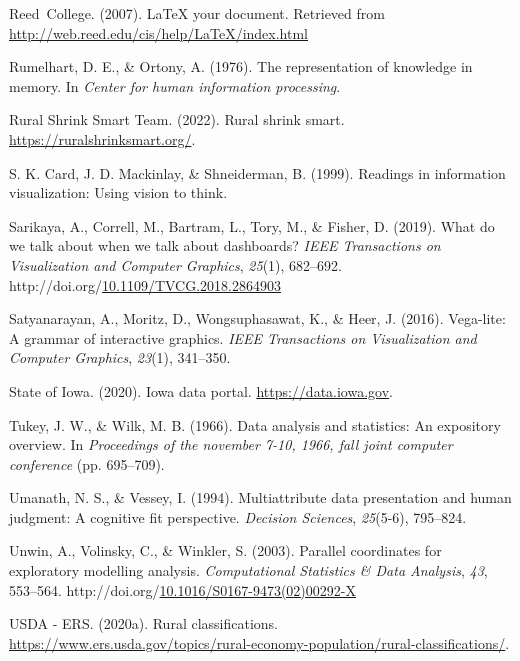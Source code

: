 \documentclass[print]{nuthesis}
\newlength{\cslhangindent}
\newenvironment{CSLReferences}[2]%
{\setlength{\parindent}{0pt}%
\everypar{\setlength{\hangindent}{\cslhangindent}}\ignorespaces}%
{\par}
\begin{document}
\begin{CSLReferences}{1}{0}
\leavevmode\hypertarget{ref-reedweb2007}{}%
Reed~College. (2007). LaTeX your document. Retrieved from \url{http://web.reed.edu/cis/help/LaTeX/index.html}

\leavevmode\hypertarget{ref-rumelhart1976}{}%
Rumelhart, D. E., \& Ortony, A. (1976). The representation of knowledge in memory. In \emph{Center for human information processing}.

\leavevmode\hypertarget{ref-scc}{}%
Rural Shrink Smart Team. (2022). Rural shrink smart. \url{https://ruralshrinksmart.org/}.

\leavevmode\hypertarget{ref-Card}{}%
S. K. Card, J. D. Mackinlay, \& Shneiderman, B. (1999). Readings in information visualization: Using vision to think.

\leavevmode\hypertarget{ref-fisher}{}%
Sarikaya, A., Correll, M., Bartram, L., Tory, M., \& Fisher, D. (2019). What do we talk about when we talk about dashboards? \emph{IEEE Transactions on Visualization and Computer Graphics}, \emph{25}(1), 682--692. http://doi.org/\href{https://doi.org/10.1109/TVCG.2018.2864903}{10.1109/TVCG.2018.2864903}

\leavevmode\hypertarget{ref-satyanarayan2016}{}%
Satyanarayan, A., Moritz, D., Wongsuphasawat, K., \& Heer, J. (2016). Vega-lite: A grammar of interactive graphics. \emph{IEEE Transactions on Visualization and Computer Graphics}, \emph{23}(1), 341--350.

\leavevmode\hypertarget{ref-iowa_gov}{}%
State of Iowa. (2020). Iowa data portal. \url{https://data.iowa.gov}.

\leavevmode\hypertarget{ref-tukey1966}{}%
Tukey, J. W., \& Wilk, M. B. (1966). Data analysis and statistics: An expository overview. In \emph{Proceedings of the november 7-10, 1966, fall joint computer conference} (pp. 695--709).

\leavevmode\hypertarget{ref-umanath1994}{}%
Umanath, N. S., \& Vessey, I. (1994). Multiattribute data presentation and human judgment: A cognitive fit perspective. \emph{Decision Sciences}, \emph{25}(5-6), 795--824.

\leavevmode\hypertarget{ref-unwin2003}{}%
Unwin, A., Volinsky, C., \& Winkler, S. (2003). Parallel coordinates for exploratory modelling analysis. \emph{Computational Statistics \& Data Analysis}, \emph{43}, 553--564. http://doi.org/\href{https://doi.org/10.1016/S0167-9473(02)00292-X}{10.1016/S0167-9473(02)00292-X}

\leavevmode\hypertarget{ref-Rural_classification}{}%
USDA - ERS. (2020a). Rural classifications. \url{https://www.ers.usda.gov/topics/rural-economy-population/rural-classifications/}.


\end{CSLReferences}
\end{document}
